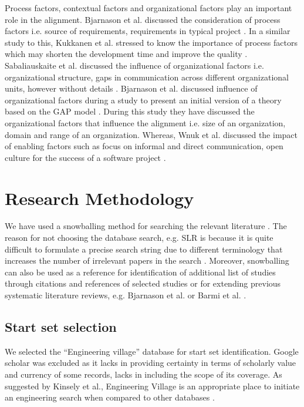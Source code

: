 \documentclass{article}
\begin{document}
Process factors, contextual factors and organizational factors play an important role in the alignment. Bjarnason et al. discussed the consideration of process factors i.e. source of requirements, requirements in typical project \cite{bjarnason2015industrial}. In a similar study to this, Kukkanen et al. stressed to know the importance of process factors which may shorten the development time and improve the quality \cite{kukkanen2009applying}. Sabaliauskaite et al.  discussed the influence of organizational factors i.e. organizational structure, gaps in communication across different organizational units, however without details \cite{sabaliauskaite2010challenges}.  Bjarnason et al. discussed influence of organizational factors during a study to present an initial version of a theory based on the GAP model \cite{bjarnason2013distances}. During this study they have discussed the organizational factors that influence the alignment i.e. size of an organization, domain and range of an organization. Whereas, Wnuk et al.  discussed the impact of enabling factors such as focus on informal and direct communication, open culture for the success of a software project \cite{wnuk2014delicate}.

\section{Research Methodology}\label{RM}


We have used a snowballing method for searching the relevant literature \cite{wohlin2014guidelines}. The reason for not choosing the database search, e.g. SLR is because it is quite difficult to formulate a precise search string due to different terminology that increases the number of irrelevant papers in the search \cite{wohlin2014guidelines,kitchenham2009systematic,kitchenham2010systematic}. Moreover, snowballing can also be used as a reference for identification of additional list of studies through citations and references of selected studies \cite{wohlin2014guidelines} or for extending previous systematic literature reviews, e.g. Bjarnason et al. \cite{bjarnason2013distances} or Barmi et al. \cite{barmi2011alignment}.

\subsection{Start set selection }
We selected the “Engineering village” database for start set identification. Google scholar was excluded as it lacks in providing certainty in terms of scholarly value and currency of some records, lacks in including the scope of its coverage. As suggested by Kinsely et al.,  Engineering Village is an appropriate place to initiate an engineering search when compared to other databases \cite{knisely2014engineering}. 
\end{document}
